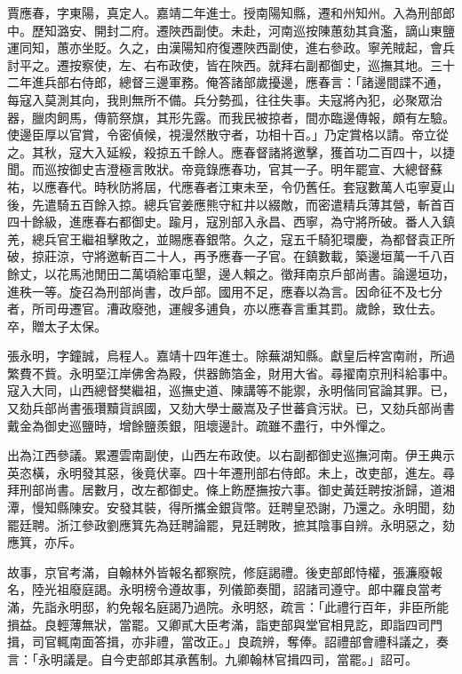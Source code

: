 \begin{pinyinscope}
賈應春，字東陽，真定人。嘉靖二年進士。授南陽知縣，遷和州知州。入為刑部郎中。歷知潞安、開封二府。遷陜西副使。未赴，河南巡按陳蕙劾其貪濫，謫山東鹽運同知，蕙亦坐貶。久之，由漢陽知府復遷陜西副使，進右參政。寧羌賊起，會兵討平之。遷按察使，左、右布政使，皆在陜西。就拜右副都御史，巡撫其地。三十二年進兵部右侍郎，總督三邊軍務。俺答諸部歲擾邊，應春言：「諸邊間諜不通，每寇入莫測其向，我則無所不備。兵分勢孤，往往失事。夫寇將內犯，必聚眾治器，臘肉飼馬，傳箭祭旗，其形先露。而我民被掠者，間亦臨邊傳報，頗有左驗。使邊臣厚以官賞，令密偵候，視漫然散守者，功相十百。」乃定賞格以請。帝立從之。其秋，寇大入延綏，殺掠五千餘人。應春督諸將邀擊，獲首功二百四十，以捷聞。而巡按御史吉澄極言敗狀。帝竟錄應春功，官其一子。明年罷宣、大總督蘇祐，以應春代。時秋防將屆，代應春者江東未至，令仍舊任。套寇數萬人屯寧夏山後，先遣騎五百餘入掠。總兵官姜應熊守紅井以綴敵，而密遣精兵薄其營，斬首百四十餘級，進應春右都御史。踰月，寇別部入永昌、西寧，為守將所破。番人入鎮羌，總兵官王繼祖擊敗之，並賜應春銀幣。久之，寇五千騎犯環慶，為都督袁正所破，掠莊涼，守將邀斬百二十人，再予應春一子官。在鎮數載，築邊垣萬一千八百餘丈，以花馬池閒田二萬頃給軍屯墾，邊人賴之。徵拜南京戶部尚書。論邊垣功，進秩一等。旋召為刑部尚書，改戶部。國用不足，應春以為言。因命征不及七分者，所司毋遷官。漕政廢弛，運艘多逋負，亦以應春言重其罰。歲餘，致仕去。卒，贈太子太保。

張永明，字鐘誠，烏程人。嘉靖十四年進士。除蕪湖知縣。獻皇后梓宮南祔，所過繁費不貲。永明堊江岸佛舍為殿，供器飾箔金，財用大省。尋擢南京刑科給事中。寇入大同，山西總督樊繼祖，巡撫史道、陳講等不能禦，永明偕同官論其罪。已，又劾兵部尚書張瓚黷貨誤國，又劾大學士嚴嵩及子世蕃貪污狀。已，又劾兵部尚書戴金為御史巡鹽時，增餘鹽羨銀，阻壞邊計。疏雖不盡行，中外憚之。

出為江西參議。累遷雲南副使，山西左布政使。以右副都御史巡撫河南。伊王典示英恣橫，永明發其惡，後竟伏辜。四十年遷刑部右侍郎。未上，改吏部，進左。尋拜刑部尚書。居數月，改左都御史。條上飭歷撫按六事。御史黃廷聘按浙歸，道湘潭，慢知縣陳安。安發其裝，得所攜金銀貨幣。廷聘皇恐謝，乃還之。永明聞，劾罷廷聘。浙江參政劉應箕先為廷聘論罷，見廷聘敗，摭其陰事自辨。永明惡之，劾應箕，亦斥。

故事，京官考滿，自翰林外皆報名都察院，修庭謁禮。後吏部郎恃權，張濂廢報名，陸光祖廢庭謁。永明榜令遵故事，列儀節奏聞，詔諸司遵守。郎中羅良當考滿，先詣永明邸，約免報名庭謁乃過院。永明怒，疏言：「此禮行百年，非臣所能損益。良輕薄無狀，當罷。又卿貳大臣考滿，詣吏部與堂官相見訖，即詣四司門揖，司官輒南面答揖，亦非禮，當改正。」良疏辨，奪俸。詔禮部會禮科議之，奏言：「永明議是。自今吏部郎其承舊制。九卿翰林官揖四司，當罷。」詔可。


\end{pinyinscope}
